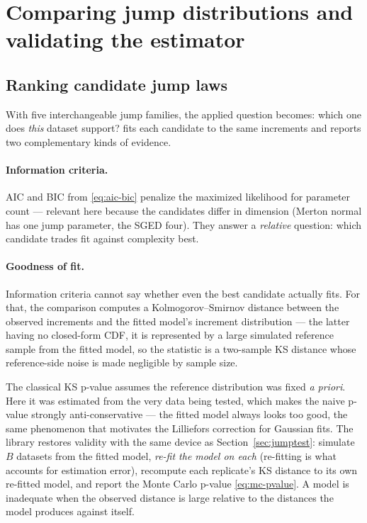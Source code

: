 \section{Comparing jump distributions and validating the estimator}
\label{sec:comparison}

\subsection{Ranking candidate jump laws}

With five interchangeable jump families, the applied question becomes:
which one does \emph{this} dataset support?
 fits each candidate to the same
increments and reports two complementary kinds of evidence.

\paragraph{Information criteria.} AIC and BIC from \eqref{eq:aic-bic}
penalize the maximized likelihood for parameter count --- relevant here
because the candidates differ in dimension (Merton normal has one jump
parameter, the SGED four). They answer a \emph{relative} question: which
candidate trades fit against complexity best.

\paragraph{Goodness of fit.} Information criteria cannot say whether even
the best candidate actually fits. For that, the comparison computes a
Kolmogorov--Smirnov distance between the observed increments and the
fitted model's increment distribution --- the latter having no closed-form
CDF, it is represented by a large simulated reference sample from the
fitted model, so the statistic is a two-sample KS distance whose
reference-side noise is made negligible by sample size.

\begin{decision}
\label{dec:ks-bootstrap}
The classical KS p-value assumes the reference distribution was fixed
\emph{a priori}. Here it was estimated from the very data being tested,
which makes the naive p-value strongly anti-conservative --- the fitted
model always looks too good, the same phenomenon that motivates the
Lilliefors correction for Gaussian fits. The library restores validity
with the same device as Section~\ref{sec:jumptest}: simulate
$B$ datasets from the fitted model, \emph{re-fit the model on each}
(re-fitting is what accounts for estimation error), recompute each
replicate's KS distance to its own re-fitted model, and report the Monte
Carlo p-value \eqref{eq:mc-pvalue}. A model is inadequate when the
observed distance is large relative to the distances the model produces
against itself.
\end{decision}

